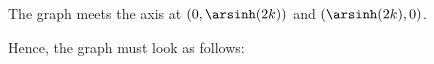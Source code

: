 \begin{enumerate}
          The graph meets the axis at \((0, \arsinh(2k))\) and \((\arsinh(2k), 0)\).

          Hence, the graph must look as follows:
          \begin{center}
              
          \end{center}
\end{enumerate}